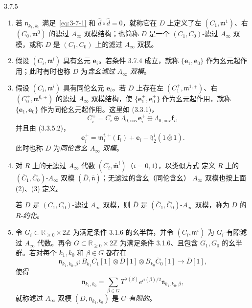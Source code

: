 \begin{definition}{3.7.5}\label{def:3-7-5}
\begin{enumerate}[label=\textup{(\arabic*)},leftmargin=2.8em]
  \item 若 $\mathfrak n_{k_1,k_0}$ 满足~\eqref{eq:3-7-1} 和
  $\widehat d\circ\widehat d=0$，就称它在 $D$ 上定义了左
  $(C_1,\mathfrak m^1)$、右 $(C_0,\mathfrak m^0)$ 的滤过
  $A_\infty$ 双模结构；也简称 $D$ 是一个 $(C_1,C_0)$-滤过
  $A_\infty$ 双模，或称 $D$ 是
  $(C_1,C_0)$ 上的滤过 $A_\infty$ 双模。

  \item 假设 $(C_i,\mathfrak m^i)$ 具有幺元 $\mathbf e_i$。若条件 3.7.4
  成立，就称 $\{\mathbf e_1,\mathbf e_0\}$ 作为幺元起作用；此时有时也称
  $D$ 为\emph{含幺滤过 $A_\infty$ 双模}。

  \item 假设 $(C_i,\mathfrak m^i)$ 具有同伦幺元 $\mathbf e_i$。若 $D$
  上存在左 $(C_1^+,\mathfrak m^{1,+})$、右
  $(C_0^+,\mathfrak m^{0,+})$ 的滤过 $A_\infty$ 双模结构，使
  $\{\mathbf e_1^+,\mathbf e_0^+\}$ 作为幺元起作用，就称
  $\{\mathbf e_1,\mathbf e_0\}$ 作为同伦幺元起作用。这里如 (3.3.1)，
  \[
    C_i^+=C_i\oplus\Lambda_{0,\mathrm{nov}}\mathbf e_i^+
      \oplus\Lambda_{0,\mathrm{nov}}\mathbf f_i,
  \]
  并且由 (3.3.5.2)，
  \[
    \mathbf e_i^+=\mathfrak m_1^{i,+}(\mathbf f_i)+\mathbf e_i
      -\mathfrak h_2^i(1\mathbin{\overline\otimes}1).
  \]
  此时也称 $D$ 为\emph{同伦含幺 $A_\infty$ 双模}。

  \item 对 $R$ 上的无滤过 $A_\infty$ 代数
  $(\overline C_i,\overline{\mathfrak m}^{i})$（$i=0,1$），以类似方式
  定义 $R$ 上的 $(\overline C_1,\overline C_0)$-$A_\infty$ 双模
  $(\overline D,\overline{\mathfrak n})$；无滤过的含幺（同伦含幺）
  $A_\infty$ 双模也按上面 (2)、(3) 定义。

  若 $D$ 是 $(C_1,C_0)$-滤过 $A_\infty$ 双模，则 $\overline D$ 是
  $(\overline C_1,\overline C_0)$-$A_\infty$ 双模，称为 $D$ 的
  $R$-\emph{约化}。

  \item 令 $G_i\subset\mathbb R_{\geq0}\times2\mathbb Z$ 为满足条件
  3.1.6 的幺半群，并令 $(C_i,\mathfrak m^i)$ 为 $G_i$-有隙滤过
  $A_\infty$ 代数。再令 $G\subset\mathbb R_{\geq0}\times2\mathbb Z$
  为满足条件 3.1.6、且包含 $G_1,G_0$ 的幺半群。若对每个
  $k_1,k_0$ 和 $\beta\in G$ 都存在
  \[
    \mathfrak n_{k_1,k_0,\beta}\colon
    B_{k_1}\overline C_1[1]\otimes\overline D[1]
    \otimes B_{k_0}\overline C_0[1]\longrightarrow\overline D[1],
  \]
  使得
  \[
    \mathfrak n_{k_1,k_0}
    =\sum_{\beta\in G}T^{\lambda(\beta)}e^{\mu(\beta)/2}
      \mathfrak n_{k_1,k_0,\beta},
  \]
  就称滤过 $A_\infty$ 双模 $(D,\mathfrak n_{k_1,k_0})$ 是
  $G$-\emph{有隙的}。
\end{enumerate}


\end{definition}
